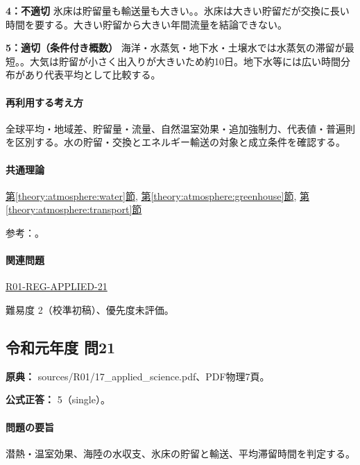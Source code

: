 \noindent\textbf{4：不適切} 氷床は貯留量も輸送量も大きい。。氷床は大きい貯留だが交換に長い時間を要する。大きい貯留から大きい年間流量を結論できない。\par

\noindent\textbf{5：適切（条件付き概数）} 海洋・水蒸気・地下水・土壌水では水蒸気の滞留が最短。。大気は貯留が小さく出入りが大きいため約10日。地下水等には広い時間分布があり代表平均として比較する。\par

\paragraph{再利用する考え方} 全球平均・地域差、貯留量・流量、自然温室効果・追加強制力、代表値・普遍則を区別する。水の貯留・交換とエネルギー輸送の対象と成立条件を確認する。

\paragraph{共通理論} \hyperref[theory:atmosphere:water]{第\ref*{theory:atmosphere:water}節}, \hyperref[theory:atmosphere:greenhouse]{第\ref*{theory:atmosphere:greenhouse}節}, \hyperref[theory:atmosphere:transport]{第\ref*{theory:atmosphere:transport}節}

\par 参考：\cite{atm_usgs_water,atm_usgs_cycle,atm_jma_ghg2012}。

\paragraph{関連問題} \hyperref[q:r01-reg-applied-21]{R01-REG-APPLIED-21}

\par 難易度 2（校準初稿）、優先度未評価。

\subsection{令和元年度 問21}
\label{q:r01-reg-applied-21}

\noindent\textbf{原典：} sources/R01/17\_applied\_science.pdf、PDF物理7頁。

\textbf{公式正答：} 5（single）。

\paragraph{問題の要旨} 潜熱・温室効果、海陸の水収支、氷床の貯留と輸送、平均滞留時間を判定する。


